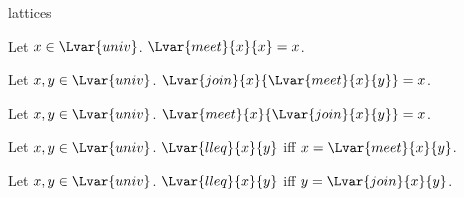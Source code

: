 \documentclass{stex}
\begin{document}
\begin{smodule}{lattices}
\begin{forthel}
    \begin{proposition}
      Let $x\in\Lvar{univ}$.
      $\Lvar{meet}{x}{x}=x$.
    \end{proposition}

    \begin{proposition}
      Let $x,y\in\Lvar{univ}$.
      $\Lvar{join}{x}{\Lvar{meet}{x}{y}}=x$.
    \end{proposition}

    \begin{proposition}
      Let $x,y\in\Lvar{univ}$.
      $\Lvar{meet}{x}{\Lvar{join}{x}{y}}=x$.
    \end{proposition}

    \begin{proposition}
      Let $x,y\in\Lvar{univ}$.
      $\Lvar{lleq}{x}{y}$ iff $x=\Lvar{meet}{x}{y}$.
    \end{proposition}

    \begin{proposition}
      Let $x,y\in\Lvar{univ}$.
      $\Lvar{lleq}{x}{y}$ iff $y=\Lvar{join}{x}{y}$.
    \end{proposition}
  \end{forthel}
\end{smodule}
\end{document}
